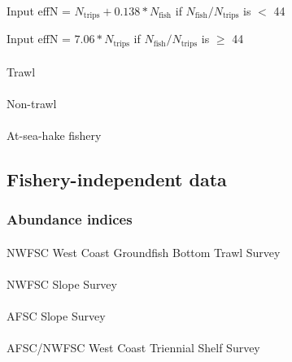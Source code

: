 \documentclass[
]{scrartcl}
\makeatletter
\let\oldparagraph\paragraph
\renewcommand{\paragraph}{
    \@ifstar
      \xxxParagraphStar
      \xxxParagraphNoStar
  }
\newcommand{\xxxParagraphStar}[1]{\oldparagraph*{#1}\mbox{}}
\newcommand{\xxxParagraphNoStar}[1]{\oldparagraph{#1}\mbox{}}
\makeatother
\begin{document}
\begin{centering}

Input effN = $N_{\text{trips}} + 0.138 * N_{\text{fish}}$ if $N_{\text{fish}}/N_{\text{trips}}$ is $<$ 44

Input effN = $7.06 * N_{\text{trips}}$ if $N_{\text{fish}}/N_{\text{trips}}$ is $\geq$ 44

\end{centering}

\paragraph{Trawl}\label{trawl-2}

\paragraph{Non-trawl}\label{non-trawl-2}

\paragraph{At-sea-hake fishery}\label{at-sea-hake-fishery-1}

\subsection{Fishery-independent data}\label{fishery-independent-data}

\subsubsection{Abundance indices}\label{abundance-indices}

\paragraph{NWFSC West Coast Groundfish Bottom Trawl
Survey}\label{nwfsc-west-coast-groundfish-bottom-trawl-survey}

\paragraph{NWFSC Slope Survey}\label{nwfsc-slope-survey}

\paragraph{AFSC Slope Survey}\label{afsc-slope-survey}

\paragraph{AFSC/NWFSC West Coast Triennial Shelf
Survey}\label{afscnwfsc-west-coast-triennial-shelf-survey}
\end{document}
